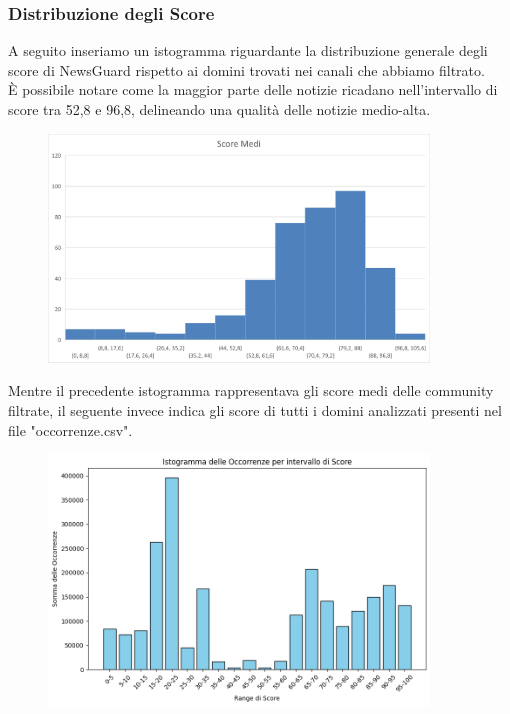 \documentclass[12pt]{article}
\begin{document}
	\subsubsection{Distribuzione degli Score}
	A seguito inseriamo un istogramma riguardante la distribuzione generale degli score di NewsGuard rispetto ai domini trovati nei canali che abbiamo filtrato.\\
	È possibile notare come la maggior parte delle notizie ricadano nell'intervallo di score tra 52,8 e 96,8, delineando una qualità delle notizie medio-alta.\\
	\begin{figure}[H]
		\centering
		\includegraphics[width=0.9\textwidth]{immagini/scoremedi}
	\end{figure}
	
	Mentre il precedente istogramma rappresentava gli score medi delle community filtrate, il seguente invece indica gli score di tutti i domini analizzati presenti nel file "occorrenze.csv".
	\begin{figure}[H]
		\centering
		\includegraphics[width=0.9\textwidth]{immagini/istogrammarange}
	\end{figure}
	
\end{document}
